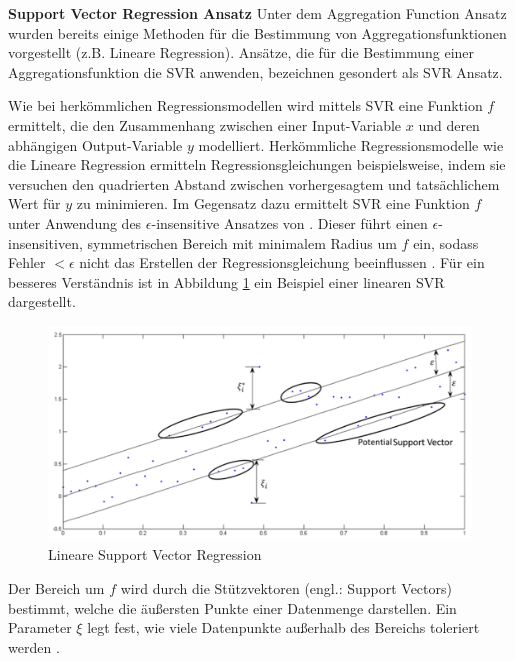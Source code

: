 \textbf{Support Vector Regression Ansatz}
Unter dem Aggregation Function Ansatz wurden bereits einige Methoden für die Bestimmung von Aggregationsfunktionen vorgestellt (z.B. Lineare Regression).
Ansätze, die für die Bestimmung einer Aggregationsfunktion die \ac{SVR} \cite[S. 155ff.]{drucker:inproceedings} anwenden, bezeichnen \textcite[S. 865]{adomavicius:4:inbook} gesondert als \ac{SVR} Ansatz.

Wie bei herkömmlichen Regressionsmodellen wird mittels \ac{SVR} eine Funktion $f$ ermittelt, die den Zusammenhang zwischen einer Input-Variable $x$ und deren abhängigen Output-Variable $y$ modelliert.
Herkömmliche Regressionsmodelle wie die Lineare Regression ermitteln Regressionsgleichungen beispielsweise, indem sie versuchen den quadrierten Abstand zwischen vorhergesagtem und tatsächlichem Wert für $y$ zu minimieren.
Im Gegensatz dazu ermittelt \ac{SVR} eine Funktion $f$ unter Anwendung des $\epsilon$-insensitive Ansatzes von \textcite[S. 181]{vapnik:book} \cite[S. 67]{awad:inbook}.
Dieser führt einen $\epsilon$-insensitiven, symmetrischen Bereich mit minimalem Radius um $f$ ein, sodass Fehler $< \epsilon$ nicht das Erstellen der Regressionsgleichung beeinflussen \cite[S. 67]{awad:inbook}.
Für ein besseres Verständnis ist in Abbildung \ref{fig:optimierung:loesungen:abb3} ein Beispiel einer linearen \ac{SVR} dargestellt.

\begin{figure}[H]
    \centering
	\includegraphics[width=1.0\textwidth]{gfx/svr.png}
	\caption[Lineare Support Vector Regression]{Lineare Support Vector Regression \cite[S. 68]{awad:inbook}}
	\label{fig:optimierung:loesungen:abb3}
\end{figure}

Der Bereich um $f$ wird durch die Stützvektoren (engl.: Support Vectors) bestimmt, welche die äußersten Punkte einer Datenmenge darstellen.
Ein Parameter $\xi$ legt fest, wie viele Datenpunkte außerhalb des Bereichs toleriert werden \cite[S. 70]{awad:inbook}.

